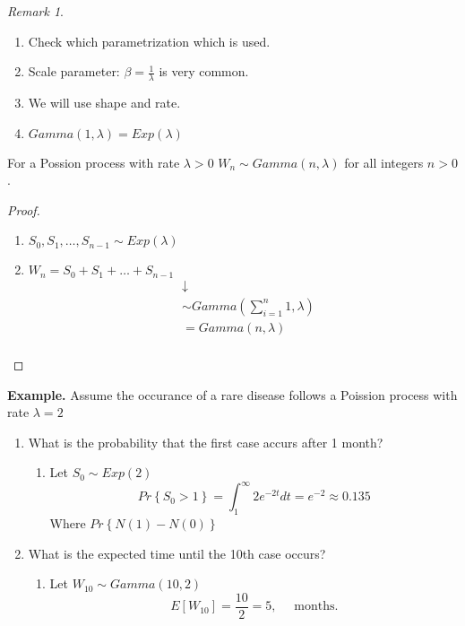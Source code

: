 \documentclass{article}
\theoremstyle{remark}
\newtheorem*{remark}{Remark}
\begin{document}
\begin{remark}
  \begin{enumerate}[label=(\roman*)]
    \item Check which parametrization which is used.
    \item Scale parameter: $\beta  = \frac{1}{\lambda }$ is very common.
    \item We will use shape and rate.
    \item $Gamma\left( 1, \lambda  \right) = Exp \left( \lambda  \right)$
  \end{enumerate}
\end{remark}
\begin{theorem}
  For a Possion process with rate $\lambda  > 0$ $W_{n} \sim Gamma\left( n, \lambda  \right)$ for all integers  $n > 0$.
\end{theorem}

\begin{proof}
  \begin{enumerate}[label=(\roman*)]
    \item $\displaystyle S_{0}, S_{1}, \ldots, S_{n-1} \sim Exp\left( \lambda  \right)$
    \item $\displaystyle W_{n} = S_{0} + S_{1} + \ldots + S_{n-1}  $ \[
        \begin{split}
      &  \downarrow  \\
       &  \sim Gamma\left( \sum_{i=1}^{n} 1 , \lambda  \right) \\
       &= Gamma\left( n, \lambda  \right) \\
        \end{split}
    \]
  \end{enumerate}
\end{proof}

\begin{tcolorbox}
  \textbf{Example.} Assume the occurance of a rare disease follows a Poission process with rate $ \lambda  = 2$
  \begin{enumerate}[label=(\alph*)]
    \item What is the probability that the first case accurs after 1 month?
      \begin{enumerate}[label=(\roman*)]
        \item Let $S_{0}  \sim Exp \left( 2 \right)$ \[
        Pr \left \{ S _{0} > 1 \right \}  = \int_{1}^{\infty}  2 e^{ -2t} dt = e^{-2} \approx 0.135
        \]
        Where  $\displaystyle  Pr \left \{ N\left( 1 \right) - N\left( 0 \right) \right \} $
      \end{enumerate}
    \item What is the expected time until the 10th case occurs?
      \begin{enumerate}[label=(\roman*)]
        \item Let $ W_{10} \sim Gamma\left( 10,2 \right)$ \[
        E\left[ W_{10} \right] = \frac{10}{2} = 5, \quad  \text{ months.}
        \]
      \end{enumerate}
  \end{enumerate}
\end{tcolorbox}
\end{document}
